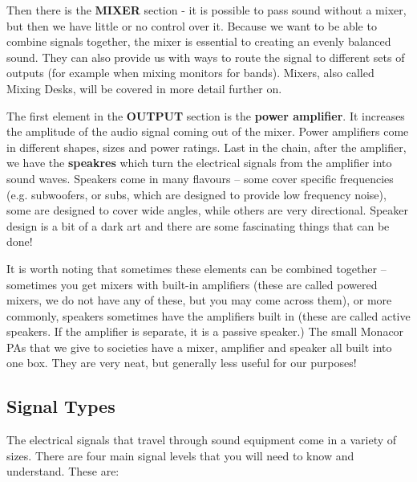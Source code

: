 \documentclass[14pt,twocolumn]{extarticle} %
\begin{document}
Then there is the \textbf{MIXER} section - it is possible to pass sound without a mixer, but then we have little or no control over it. Because we want to be able to combine signals together, the mixer is essential to creating an evenly balanced sound. They can also provide us with ways to route the signal to different sets of outputs (for example when mixing monitors for bands). Mixers, also called Mixing Desks, will be covered in more detail further on.

The first element in the \textbf{OUTPUT} section is the \textbf{power amplifier}. It increases the amplitude of the audio signal coming out of the mixer. Power amplifiers come in different shapes, sizes and power ratings. Last in the chain, after the amplifier, we have the \textbf{speakres} which turn the electrical signals from the amplifier into
sound waves. Speakers come in many flavours – some cover specific frequencies (e.g. subwoofers, or subs, which are designed to provide low frequency noise), some are designed to cover wide angles, while others are very directional. Speaker design is a bit of a dark art and there are some fascinating things that can be done!

It is worth noting that sometimes these elements can be combined together – sometimes you get mixers with built-in amplifiers (these are called powered mixers, we do not have any of these, but you may come across them), or more commonly, speakers sometimes have the amplifiers built in (these are called active speakers. If the amplifier is separate, it is a passive speaker.) The small Monacor PAs that we give to societies have a mixer, amplifier and speaker all built into one box. They are very neat, but generally less useful for our purposes!

\subsection{Signal Types}
\label{signal-types}
The electrical signals that travel through sound equipment come in a variety of sizes.
There are four main signal levels that you will need to know and understand. These are:
\end{document}
